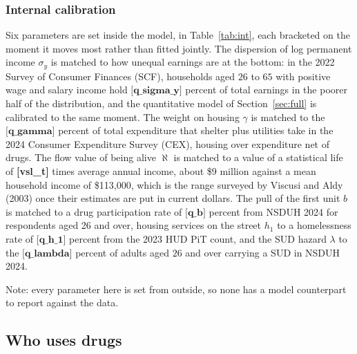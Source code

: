 \documentclass[10pt]{article}
\newcommand{\notes}[2]{\par\vspace{0.4em}%
  \begin{minipage}{#1}\footnotesize #2\end{minipage}}
\newcommand{\tabnote}[1]{\notes{\wd\ntbox}{#1}}
\begin{document}
\subsubsection{Internal calibration}

Six parameters are set inside the model, in Table~\ref{tab:int}, each bracketed
on the moment it moves most rather than fitted jointly. The dispersion of log
permanent income $\sigma_y$ is matched to how unequal earnings are at the bottom: in
the 2022 Survey of Consumer Finances (SCF), households aged $26$ to $65$ with positive wage
and salary income hold $\textbf{[q_sigma_y]}$ percent of total earnings in the poorer half of the
distribution, and the
quantitative model of Section~\ref{sec:full} is calibrated to the same moment.
The weight on
housing $\gamma$ is matched to the $\textbf{[q_gamma]}$ percent of total expenditure that
shelter plus utilities take in the 2024 Consumer Expenditure Survey (CEX),
housing over expenditure net of drugs. The flow value
of being alive $\aleph$ is matched to a value of a statistical life of \textbf{[vsl_t]}
times average annual income, about \$9 million against a mean household income of
\$113,000, which is the range surveyed by Viscusi and Aldy (2003) once their
estimates are put in current dollars. The pull of the first unit $b$ is matched
to a drug participation rate of $\textbf{[q_b]}$ percent from NSDUH 2024 for
respondents aged 26 and over, housing services on the street
$h_1$ to a homelessness rate of $\textbf{[q_h_1]}$ percent from the 2023 HUD PiT count, and the SUD hazard $\lambda$ to the $\textbf{[q_lambda]}$ percent
of adults aged $26$ and over carrying a SUD in NSDUH 2024.

\begin{table}[!tb]
\centering
\caption{Externally set parameters}\label{tab:ext}
\sbox{\ntbox}{}\usebox{\ntbox}
\tabnote{Note: every parameter here is set from outside, so none has a model counterpart to report against the data.}
\end{table}

\begin{table}[!tb]
\centering
\caption{Internally calibrated parameters}\label{tab:int}

\end{table}

\subsection{Who uses drugs}\label{sec:who}
\end{document}
